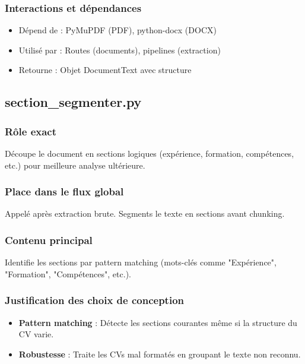 \documentclass[12pt,a4paper,oneside]{book}
\begin{document}
\subsubsection{Interactions et dépendances}

\begin{itemize}
    \item Dépend de : PyMuPDF (PDF), python-docx (DOCX)
    \item Utilisé par : Routes (documents), pipelines (extraction)
    \item Retourne : Objet DocumentText avec structure
\end{itemize}

\subsection{section\_segmenter.py}

\subsubsection{Rôle exact}

Découpe le document en sections logiques (expérience, formation, compétences, etc.) pour meilleure analyse ultérieure.

\subsubsection{Place dans le flux global}

Appelé après extraction brute. Segments le texte en sections avant chunking.

\subsubsection{Contenu principal}

Identifie les sections par pattern matching (mots-clés comme "Expérience", "Formation", "Compétences", etc.).

\subsubsection{Justification des choix de conception}

\begin{itemize}
    \item \textbf{Pattern matching} : Détecte les sections courantes même si la structure du CV varie.
    
    \item \textbf{Robustesse} : Traite les CVs mal formatés en groupant le texte non reconnu.
\end{itemize}
\end{document}
